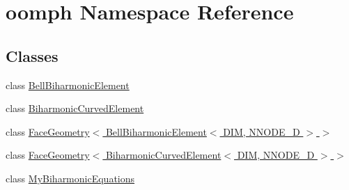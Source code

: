 \hypertarget{namespaceoomph}{}\section{oomph Namespace Reference}
\label{namespaceoomph}
\subsection*{Classes}
\begin{DoxyCompactItemize}
\item 
class \hyperlink{classoomph_1_1BellBiharmonicElement}{Bell\+Biharmonic\+Element}
\item 
class \hyperlink{classoomph_1_1BiharmonicCurvedElement}{Biharmonic\+Curved\+Element}
\item 
class \hyperlink{classoomph_1_1FaceGeometry_3_01BellBiharmonicElement_3_01DIM_00_01NNODE__1D_01_4_01_4}{Face\+Geometry$<$ Bell\+Biharmonic\+Element$<$ D\+I\+M, N\+N\+O\+D\+E\+\_\+D $>$ $>$}
\item 
class \hyperlink{classoomph_1_1FaceGeometry_3_01BiharmonicCurvedElement_3_01DIM_00_01NNODE__1D_01_4_01_4}{Face\+Geometry$<$ Biharmonic\+Curved\+Element$<$ D\+I\+M, N\+N\+O\+D\+E\+\_\+D $>$ $>$}
\item 
class \hyperlink{classoomph_1_1MyBiharmonicEquations}{My\+Biharmonic\+Equations}
\end{DoxyCompactItemize}

